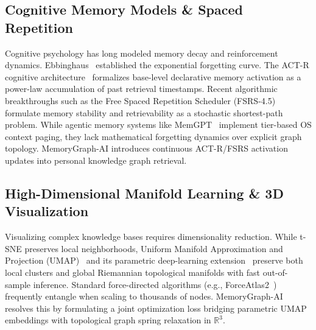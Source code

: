 \subsection{Cognitive Memory Models \& Spaced Repetition}
Cognitive psychology has long modeled memory decay and reinforcement dynamics. Ebbinghaus~\cite{ebbinghaus1885memory} established the exponential forgetting curve. The ACT-R cognitive architecture~\cite{anderson2004actr} formalizes base-level declarative memory activation as a power-law accumulation of past retrieval timestamps. Recent algorithmic breakthroughs such as the Free Spaced Repetition Scheduler (FSRS-4.5)~\cite{ye2023fsrs} formulate memory stability and retrievability as a stochastic shortest-path problem. While agentic memory systems like MemGPT~\cite{packer2023memgpt} implement tier-based OS context paging, they lack mathematical forgetting dynamics over explicit graph topology. MemoryGraph-AI introduces continuous ACT-R/FSRS activation updates into personal knowledge graph retrieval.

\subsection{High-Dimensional Manifold Learning \& 3D Visualization}
Visualizing complex knowledge bases requires dimensionality reduction. While t-SNE preserves local neighborhoods, Uniform Manifold Approximation and Projection (UMAP)~\cite{mcinnes2018umap} and its parametric deep-learning extension~\cite{sainburg2021parametric} preserve both local clusters and global Riemannian topological manifolds with fast out-of-sample inference. Standard force-directed algorithms (e.g., ForceAtlas2~\cite{jacomy2014forceatlas2}) frequently entangle when scaling to thousands of nodes. MemoryGraph-AI resolves this by formulating a joint optimization loss bridging parametric UMAP embeddings with topological graph spring relaxation in $\mathbb{R}^3$.


